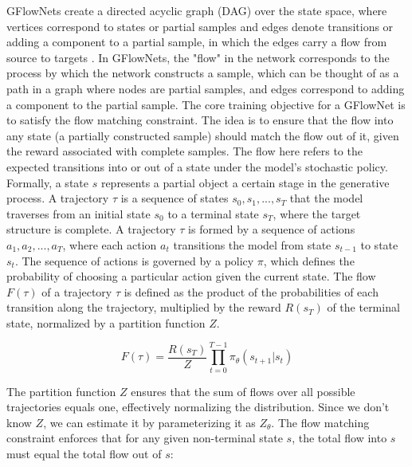 GFlowNets create a directed acyclic graph (DAG) over the state space, where vertices correspond to states or partial samples and edges denote transitions or adding a component to a partial sample, in which the edges carry a flow from source to targets \cite{bengio2023gflownet, bengio_flow_2021}.
In GFlowNets, the "flow" in the network corresponds to the process by which the network constructs a sample, which can be thought of as a path in a graph where nodes are partial samples, and edges correspond to adding a component to the partial sample.
The core training objective for a GFlowNet is to satisfy the flow matching constraint. The idea is to ensure that the flow into any state (a partially constructed sample) should match the flow out of it, given the reward associated with complete samples. The flow here refers to the expected transitions into or out of a state under the model's stochastic policy. 
Formally, a state \( s \) represents a partial object a certain stage in the generative process. A trajectory \( \tau \) is a sequence of states \( s_0, s_1, ..., s_T \) that the model traverses from an initial state \( s_0 \) to a terminal state \( s_T \), where the target structure is complete.
A trajectory \( \tau \) is formed by a sequence of actions \( a_1, a_2, ..., a_T \), where each action \( a_t \) transitions the model from state \( s_{t-1} \) to state \( s_t \). The sequence of actions is governed by a policy \( \pi \), which defines the probability of choosing a particular action given the current state.
The flow \( F(\tau) \) of a trajectory \( \tau \) is defined as the product of the probabilities of each transition along the trajectory, multiplied by the reward \( R(s_T) \) of the terminal state, normalized by a partition function \( Z \).

\begin{equation} \label{eq:flow}
    F(\tau) = \frac{R(s_T)}{Z} \prod_{t=0}^{T-1} \pi_\theta(s_{t+1} | s_{t})
\end{equation}

The partition function \( Z \) ensures that the sum of flows over all possible trajectories equals one, effectively normalizing the distribution. Since we don't know \( Z \), we can estimate it by parameterizing it as \( Z_{\theta} \).
The flow matching constraint enforces that for any given non-terminal state \( s \), the total flow into \( s \) must equal the total flow out of \( s \):

